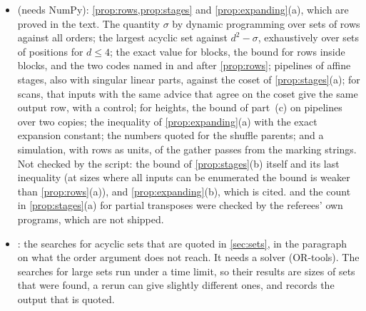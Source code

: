 \begin{itemize}[leftmargin=1.5em]
ranking lemma on every multigraph with at most five vertices and as many edges, and its sharpness for at most four;
the sets of positions of \cref{prop:order} on random relations, with their sizes; for window two, the exact
least number of positions that meets every cycle, for random relations at $d=3$ and $d=4$, against the bound; the count of
\cref{prop:order}(c) and the multiplier of its second statement on random instances; and the two counts in the proof
of \cref{prop:mutual} against enumeration; the two local codes named after \cref{prop:mutual}; and the examples
after \cref{prop:order}: the cycle for the ranking lemma up to seven vertices, the relation at $d=3$ with its code,
the codes with $d^2/2+d$ free entries at $d=4$ and~$6$, and the relation of whole rows at $d=4$. With two controls.
\item {} (needs NumPy): \cref{prop:rows,prop:stages} and
\cref{prop:expanding}(a), which are proved in the text. The quantity $\sigma$ by dynamic programming over sets of rows against all orders; the largest
acyclic set against $d^2-\sigma$, exhaustively over sets of positions for $d\le4$; the exact value for blocks, the
bound for rows inside blocks, and the two codes named in and after \cref{prop:rows}; pipelines of affine stages,
also with singular linear parts, against the coset of \cref{prop:stages}(a); for scans, that inputs with the same
advice that agree on the coset give the same output row, with a control; for heights, the bound of part~(c) on
pipelines over two copies; the inequality of \cref{prop:expanding}(a) with the exact expansion constant; the
numbers quoted for the shuffle parents; and a simulation, with rows as units, of the gather passes from the marking
strings. Not checked by the script: the bound of \cref{prop:stages}(b) itself and its last inequality (at sizes
where all inputs can be enumerated the bound is weaker than \cref{prop:rows}(a)), and \cref{prop:expanding}(b),
which is cited.  and the count in \cref{prop:stages}(a) for partial transposes were checked by
the referees' own programs, which are not shipped.
\item {}: the searches for acyclic sets that are quoted in \cref{sec:sets}, in
the paragraph on what the order argument does not reach. It needs a solver (OR-tools). The searches for large sets run under a time limit, so their results
are sizes of sets that were found, a rerun can give slightly different ones, and  records
the output that is quoted.

\end{itemize}
